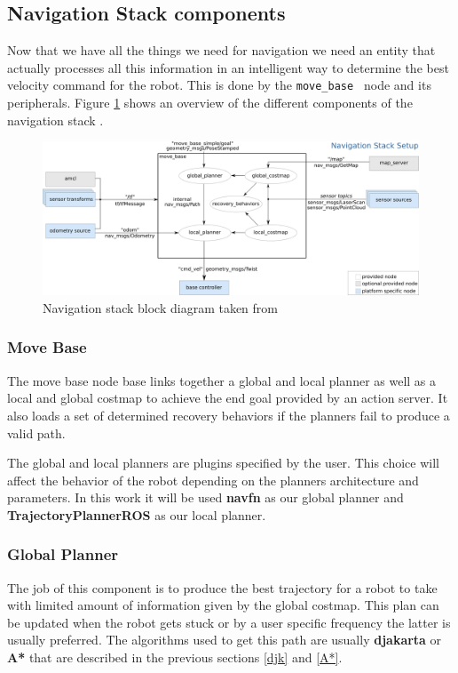 \subsection{Navigation Stack components}
Now that we have all the things we need for navigation we need an entity that actually processes all this information in an intelligent way to determine the best velocity command for the robot. This is done by the \texttt{move\_base } node and its peripherals.
Figure \ref{fig:navstack} shows an overview of the different components of the navigation stack \cite{movebase}.
\begin{figure}[!htb]
    \centering
    \includegraphics[width=\linewidth]{imgs/chapter3/navstack.png}
    \caption[Navigation stack block diagram]{Navigation stack block diagram taken from \cite{movebase}}
    \label{fig:navstack}
\end{figure}
\subsubsection{Move Base}

The move base node base links together a global and local planner as well as a local and global costmap to achieve the end goal provided by an action server. It also loads a set of determined recovery behaviors if the planners fail to produce a valid path. 

The global and local planners are plugins specified by the user. This choice will affect the behavior of the robot depending on the planners architecture and parameters. In this work it will be used \textbf{navfn} as our global planner and \textbf{TrajectoryPlannerROS} as our local planner.

\subsubsection{Global Planner}
 
The job of this component is to produce the best trajectory for a robot to take with limited amount of information given by the global costmap.
This plan can be updated when the robot gets stuck or by a user specific frequency the latter is usually preferred. The algorithms used to get this path are usually \textbf{djakarta} or \textbf{A*} that are described in the previous sections \ref{djk} and \ref{A*}.


